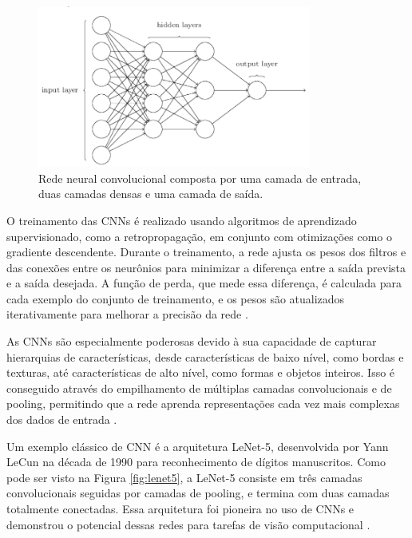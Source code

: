 \begin{figure}
    \centering   
    \includegraphics[width=0.8\textwidth]{fig/2hiddenlayers.png}
    \caption{Rede neural convolucional composta por uma camada de entrada, duas camadas densas e uma camada de saída.}
    \label{fig:hiddenlayers}
\end{figure}

O treinamento das CNNs é realizado usando algoritmos de aprendizado supervisionado, como a retropropagação, em conjunto com otimizações como o gradiente descendente. Durante o treinamento, a rede ajusta os pesos dos filtros e das conexões entre os neurônios para minimizar a diferença entre a saída prevista e a saída desejada. A função de perda, que mede essa diferença, é calculada para cada exemplo do conjunto de treinamento, e os pesos são atualizados iterativamente para melhorar a precisão da rede \cite{aggarwal2018neural}.

As CNNs são especialmente poderosas devido à sua capacidade de capturar hierarquias de características, desde características de baixo nível, como bordas e texturas, até características de alto nível, como formas e objetos inteiros. Isso é conseguido através do empilhamento de múltiplas camadas convolucionais e de pooling, permitindo que a rede aprenda representações cada vez mais complexas dos dados de entrada \cite{goodfellow2016deep}.


Um exemplo clássico de CNN é a arquitetura LeNet-5, desenvolvida por Yann LeCun na década de 1990 para reconhecimento de dígitos manuscritos. Como pode ser visto na Figura \ref{fig:lenet5}, a LeNet-5 consiste em três camadas convolucionais seguidas por camadas de pooling, e termina com duas camadas totalmente conectadas. Essa arquitetura foi pioneira no uso de CNNs e demonstrou o potencial dessas redes para tarefas de visão computacional \cite{lecun1998gradient}.

